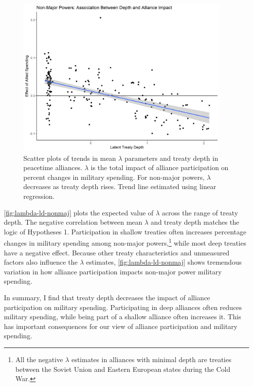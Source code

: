 \documentclass[12pt]{article}
\begin{document}
\begin{figure}[htbp]
	\centering
		\includegraphics[width=0.95\textwidth]{../figures/lambda-ld-nonmaj.png}
	\caption{Scatter plots of trends in mean $\lambda$ parameters and treaty depth in peacetime alliances. $\lambda$ is the total impact of alliance participation on percent changes in military spending. For non-major powers, $\lambda$ decreases as treaty depth rises. Trend line estimated using linear regression.}
	\label{fig:lambda-ld-nonmaj}
\end{figure}


\autoref{fig:lambda-ld-nonmaj} plots the expected value of $\lambda$ across the range of treaty depth. 
The negative correlation between mean $\lambda$ and treaty depth matches the logic of Hypotheses 1. 
Participation in shallow treaties often increases percentage changes in military spending among non-major powers,\footnote{All the negative $\lambda$ estimates in alliances with minimal depth are treaties between the Soviet Union and Eastern European states during the Cold War.} while most deep treaties have a negative effect. 
Because other treaty characteristics and unmeasured factors also influence the $\lambda$ estimates, \autoref{fig:lambda-ld-nonmaj} shows tremendous variation in how alliance participation impacts non-major power military spending. 


In summary, I find that treaty depth decreases the impact of alliance participation on military spending. 
Participating in deep alliances often reduces military spending, while being part of a shallow alliance often increases it. 
This has important consequences for our view of alliance participation and military spending. 
\end{document}
